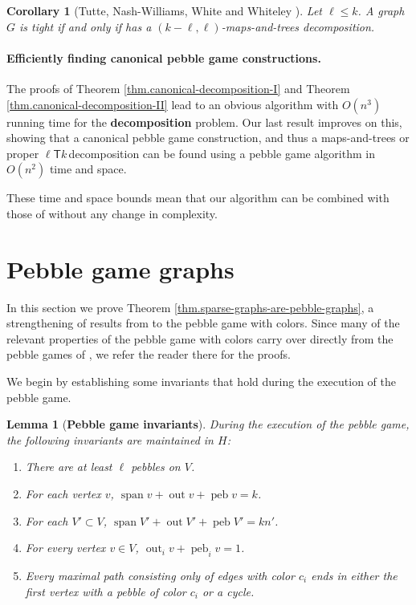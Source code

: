 \documentclass[11pt]{article}
\newcommand{\ellteekay}{\ensuremath{\ell{\mathsf T}k}\,}
\newtheorem{corollary}[theorem]{Corollary}
\newtheorem{lemma}[theorem]{Lemma}
\newcommand{\refthm}[1]{Theorem \ref{thm.#1}}
\newcommand{\labellem}[1]{\label{lem.#1}}
\newcommand{\labelcor}[1]{\label{cor.#1}}
\newcommand{\peb}{\ensuremath{\operatorname{peb}}}
\newcommand{\grsp}{\ensuremath{\operatorname{span}}}
\newcommand{\out}{\ensuremath{\operatorname{out}}}
\begin{document}
\begin{corollary}
	[Tutte, Nash-Williams, White and Whiteley \cite{tutte61,Na61,whiteley:matroids}] 
		\labelcor{m-a-t-equals-tight}
	Let $\ell\le k$. A graph $G$ is tight if and only if has a $(k-\ell,\ell)$-maps-and-trees decomposition. 
\end{corollary}
	
\paragraph{Efficiently finding canonical pebble game constructions.}
The proofs of \refthm{canonical-decomposition-I} and \refthm{canonical-decomposition-II}
lead to an obvious algorithm with $O(n^3)$ running time for the {\bf decomposition}
problem.  Our last result improves on this, showing that a canonical pebble game 
construction, and thus a maps-and-trees or proper \ellteekay decomposition can be 
found using a pebble game algorithm in $O(n^2)$ time and space.

These time and space bounds mean that our algorithm can be 
combined with those of \cite{LeSt05} without any change in complexity.

	
	
\section{Pebble game  graphs} 
In this section we prove \refthm{sparse-graphs-are-pebble-graphs},
 a strengthening of results from \cite{LeSt05} to the pebble game with colors.
Since many of the relevant properties of the pebble game with colors carry over
directly from the pebble games of \cite{LeSt05}, we refer the reader there for the proofs.
	
We begin by establishing some invariants that hold during the execution of the pebble game.
	\begin{lemma}[{\bf Pebble game invariants}]
		During the execution of the pebble game, the following invariants are maintained in $H$: 
		\begin{enumerate}
			\item[{\bf (I1)}] There are at least $\ell$ pebbles on $V$.  \cite{LeSt05}
			\item[{\bf (I2)}] For each vertex $v$, $\grsp v + \out v + \peb v=k$.  \cite{LeSt05}
			\item[{\bf (I3)}] For each $V'\subset V$, $\grsp V'+\out V'+\peb V'=kn'$. \cite{LeSt05}
			\item[{\bf (I4)}] For every vertex $v\in V$, $\out_i v+\peb_i v=1$. 
			\item[{\bf (I5)}] Every maximal path consisting only of edges with color $c_i$ ends in either the first vertex with a pebble of color $c_i$ or a cycle. 
		\end{enumerate}
		\labellem{pebble-game-invariants} 
\end{lemma}
\end{document}
